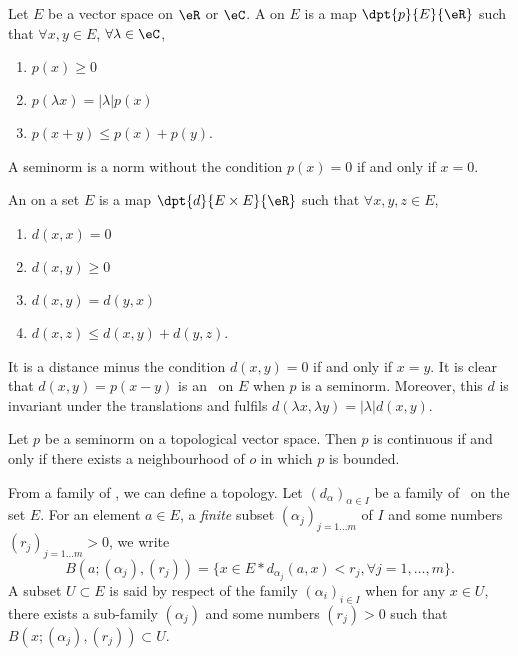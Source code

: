 \begin{definition}
	Let $E$ be a vector space on $\eR$ or $\eC$. A  on $E$ is a map $\dpt{p}{E}{\eR}$ such that $\forall x,y\in E$, $\forall\lambda\in\eC$,
	\begin{enumerate}
		\item $p(x)\geq 0$
		\item $p(\lambda x)=|\lambda|p(x)$
		\item $p(x+y)\leq p(x)+p(y)$.
	\end{enumerate}
\end{definition}
A seminorm is a norm without the condition  $p(x)=0$ if and only if $x=0$.

\begin{definition}
	An  on a set $E$ is a map $\dpt{d}{E\times E}{\eR}$ such that $\forall x,y,z\in E$,
	\begin{enumerate}
		\item $d(x,x)=0$
		\item $d(x,y)\geq 0$
		\item $d(x,y)=d(y,x)$
		\item $d(x,z)\leq d(x,y)+d(y,z)$.
	\end{enumerate}
\end{definition}
It is a distance minus the condition  $d(x,y)=0$ if and only if $x=y$.
It is clear that $d(x,y)=p(x-y)$ is an \ecart\ on $E$ when $p$ is a seminorm. Moreover, this $d$ is invariant under the translations and fulfils $d(\lambda x,\lambda y)=|\lambda|d(x,y)$.

\begin{proposition}
	Let $p$ be a seminorm on a topological vector space. Then $p$ is continuous if and only if there exists a neighbourhood of $o$ in which $p$ is bounded.
	\label{prop:semi_norm_cont}
\end{proposition}


From a family of \ecarts, we can define a topology. Let $(d_{\alpha})_{\alpha\in I}$ be a family of \ecarts\ on the set $E$. For an element $a\in E$, a \emph{finite} subset $(\alpha_j)_{j=1\ldots m}$ of $I$ and some numbers $(r_j)_{j=1\ldots m}>0$, we write
\[
	B(a; (\alpha_j),(r_j))=\{x\in E\ast d_{\alpha_j}(a,x)<r_j,\forall j=1,\ldots,m\}.
\]
\label{topo_semi_norm} A subset $U\subset E$ is said  by respect of the family $(\alpha_i)_{i\in I}$ when for any $x\in U$, there exists a sub-family $(\alpha_j)$ and some numbers $(r_j)>0$ such that $B(x;(\alpha_j),(r_j))\subset U$.

